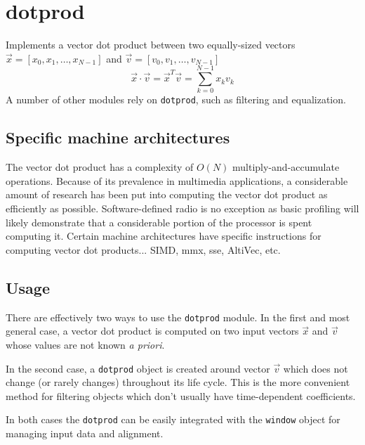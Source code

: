 % 
%

\section{dotprod}
\label{module:dotprod}
Implements a vector dot product between two equally-sized vectors
$\vec{x} = \left[x_0,x_1,\ldots,x_{N-1}\right]$ and
$\vec{v} = \left[v_0,v_1,\ldots,v_{N-1}\right]$
\[
    \vec{x} \cdot \vec{v}   =
    \vec{x}^T \vec{v}       =
    \sum_{k=0}^{N-1}x_k v_k
\]
A number of other modules rely on {\tt dotprod}, such as filtering and
equalization.

\subsection{Specific machine architectures}
\label{module:dotprod:arch}
The vector dot product has a complexity of $O(N)$ multiply-and-accumulate
operations.
Because of its prevalence in multimedia applications, a considerable amount of
research has been put into computing the vector dot product as efficiently as
possible.
Software-defined radio is no exception as basic profiling will likely
demonstrate that a considerable portion of the processor is spent computing
it.
Certain machine architectures have specific instructions for computing vector
dot products... SIMD, mmx, sse, AltiVec, etc.

\subsection{Usage}
\label{module:dotprod:usage}
There are effectively two ways to use the {\tt dotprod} module.
In the first and most general case, a vector dot product is computed on two
input vectors $\vec{x}$ and $\vec{v}$ whose values are not known
{\it a priori}.

In the second case, a {\tt dotprod} object is created around vector $\vec{v}$
which does not change (or rarely changes) throughout its life cycle.
This is the more convenient method for filtering objects which don't usually
have time-dependent coefficients.



In both cases the {\tt dotprod} can be easily integrated with the
{\tt window} object for managing input data and alignment.
